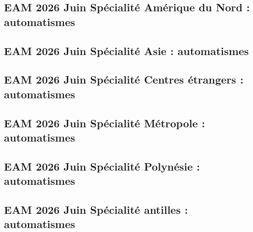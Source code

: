 \documentclass[lang=fr,edition=teacher,layout=sheet]{mxbook}
\begin{document}
\par\bigskip
{}\subsection*{EAM 2026 Juin Spécialité Amérique du Nord : automatismes}
\begingroup\endgroup
\par\bigskip
{}\subsection*{EAM 2026 Juin Spécialité Asie : automatismes}
\begingroup\endgroup
\par\bigskip
{}\subsection*{EAM 2026 Juin Spécialité Centres étrangers : automatismes}
\begingroup\endgroup
\par\bigskip
{}\subsection*{EAM 2026 Juin Spécialité Métropole : automatismes}
\begingroup\endgroup
\par\bigskip
{}\subsection*{EAM 2026 Juin Spécialité Polynésie : automatismes}
\begingroup\endgroup
\par\bigskip
{}\subsection*{EAM 2026 Juin Spécialité antilles : automatismes}
\begingroup\endgroup
\par\bigskip
\end{document}
